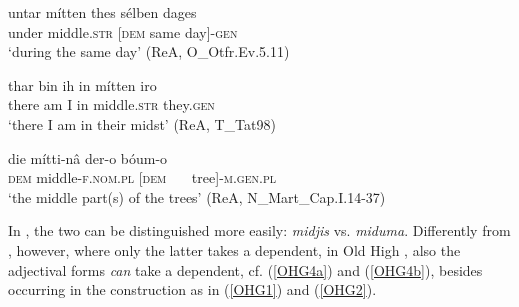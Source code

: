\documentclass[output=paper,colorlinks,citecolor=brown]{langscibook}
\begin{document}
\begin{exe}
   \ex \label{OHG4} 
    \begin{xlist} 
       \ex \label{OHG4a}  \gll untar mítten { thes} sélben dages   \\  
          under middle.\textsc{str} [\textsc{dem} same day]-\textsc{gen}   \\  
        \glt `during the same day' (ReA, O\_Otfr.Ev.5.11)

       \ex \label{OHG4b}  \gll thar bin ih in mítten  iro \\ 
          there am  I  in  middle.\textsc{str} they.\textsc{gen}   \\ 
        \glt `there I am in their midst' (ReA, T\_Tat98)

        \ex \label{OHG4c}  \gll   die mítti-n\^{a}  { der-o bóum-o}  \\ 
          \textsc{dem} middle-\textsc{f.nom.pl}  [{\textsc{dem} \ \ \ tree}]-\textsc{m.gen.pl}   \\ 
        \glt `the middle part(s) of the trees' (ReA, N\_Mart\_Cap.I.14-37)
   \end{xlist}
\end{exe}

 In , the two can be distinguished more easily: \textit{midjis} vs. \textit{miduma}. Differently from , however, where only the latter takes a  dependent, in Old High , also the adjectival   forms \textit{can} take a  dependent, cf. (\ref{OHG4a}) and (\ref{OHG4b}), besides occurring in the  construction as in (\ref{OHG1}) and (\ref{OHG2}).   
\end{document}
